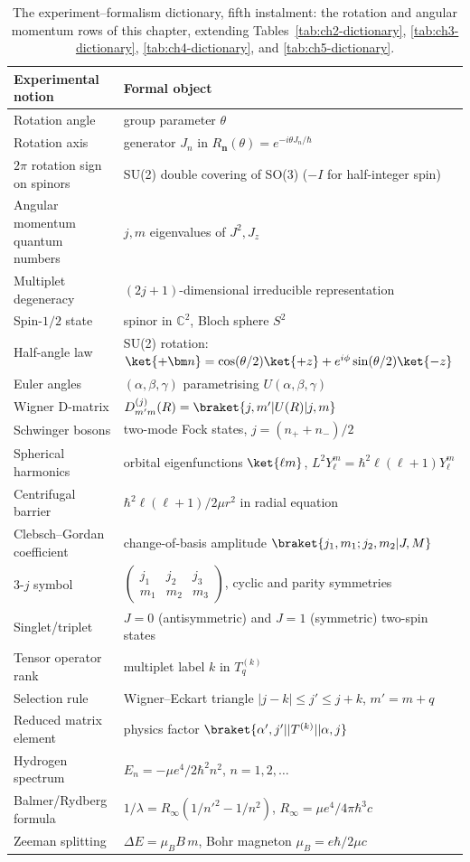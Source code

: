 \begin{table}[htbp!]
\centering
\caption{The experiment--formalism dictionary, fifth instalment: the rotation and angular momentum rows of this chapter, extending Tables~\ref{tab:ch2-dictionary}, \ref{tab:ch3-dictionary}, \ref{tab:ch4-dictionary}, and \ref{tab:ch5-dictionary}.}
\label{tab:ch6-dictionary}
\small
\setlength{\tabcolsep}{4pt}
\begin{tabular}{ll}
\toprule
Experimental notion & Formal object \\
\midrule
Rotation angle & group parameter $\theta$ \\
Rotation axis & generator $J_n$ in $R_{\bm n}(\theta) = e^{-i\theta J_n/\hbar}$ \\
$2\pi$ rotation sign on spinors & SU(2) double covering of SO(3) ($-I$ for half-integer spin) \\
Angular momentum quantum numbers & $j,m$ eigenvalues of $J^2,J_z$ \\
Multiplet degeneracy & $(2j+1)$-dimensional irreducible representation \\
Spin-$1/2$ state & spinor in $\mathbb{C}^2$, Bloch sphere $S^2$ \\
Half-angle law & SU(2) rotation: $\ket{+\bm n} = \cos(\theta/2)\ket{+z} + e^{i\phi}\sin(\theta/2)\ket{-z}$ \\
Euler angles & $(\alpha,\beta,\gamma)$ parametrising $U(\alpha,\beta,\gamma)$ \\
Wigner D-matrix & $D^{(j)}_{m'm}(R) = \braket{j,m'|U(R)|j,m}$ \\
Schwinger bosons & two-mode Fock states, $j = (n_++n_-)/2$ \\
Spherical harmonics & orbital eigenfunctions $\ket{\ell m}$, $L^2 Y_\ell^m = \hbar^2\ell(\ell+1)Y_\ell^m$ \\
Centrifugal barrier & $\hbar^2\ell(\ell+1)/2\mu r^2$ in radial equation \\
Clebsch--Gordan coefficient & change-of-basis amplitude $\braket{j_1,m_1;j_2,m_2|J,M}$ \\
3-$j$ symbol & $\begin{pmatrix}j_1&j_2&j_3\\m_1&m_2&m_3\end{pmatrix}$, cyclic and parity symmetries \\
Singlet/triplet & $J=0$ (antisymmetric) and $J=1$ (symmetric) two-spin states \\
Tensor operator rank & multiplet label $k$ in $T^{(k)}_q$ \\
Selection rule & Wigner--Eckart triangle $|j-k| \le j' \le j+k$, $m'=m+q$ \\
Reduced matrix element & physics factor $\braket{\alpha',j'||T^{(k)}||\alpha,j}$ \\
Hydrogen spectrum & $E_n = -\mu e^4/2\hbar^2 n^2$, $n=1,2,\ldots$ \\
Balmer/Rydberg formula & $1/\lambda = R_\infty(1/n'^2-1/n^2)$, $R_\infty = \mu e^4/4\pi\hbar^3 c$ \\
Zeeman splitting & $\Delta E = \mu_B B\,m$, Bohr magneton $\mu_B = e\hbar/2\mu c$ \\
\bottomrule
\end{tabular}
\end{table}

